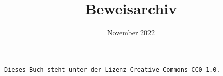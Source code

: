 \documentclass[a4paper,10pt,fleqn,twoside]{scrbook}
\title{Beweisarchiv}
\date{November 2022}
\numberwithin{equation}{chapter}
\theoremstyle{rmbox}
\begin{document}
\setlength{\baselineskip}{13pt}

\maketitle

\texttt{Dieses Buch steht unter der Lizenz Creative Commons CC0 1.0.}

\tableofcontents










\setlength{\baselineskip}{12pt}
\printindex
\end{document}
